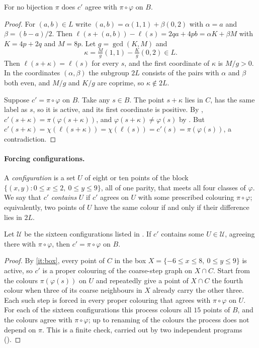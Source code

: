 \documentclass[11pt,colorlinks]{charlie}
\begin{document}
\begin{lemma}\label{lem:noblock}
For no bijection $\pi$ does $c'$ agree with $\pi\circ\varphi$ on $B$.
\end{lemma}

\begin{proof}
For $(a,b)\in L$ write $(a,b)=\alpha(1,1)+\beta(0,2)$ with $\alpha=a$ and $\beta=(b-a)/2$. Then $\ell(s+(a,b))-\ell(s)=2qa+4pb=\alpha K+\beta M$ with $K=4p+2q$ and $M=8p$. Let $g=\gcd(K,M)$ and
\[
\kappa=\tfrac Mg(1,1)-\tfrac Kg(0,2)\in L .
\]
Then $\ell(s+\kappa)=\ell(s)$ for every $s$, and the first coordinate of $\kappa$ is $M/g>0$. In the coordinates $(\alpha,\beta)$ the subgroup $2L$ consists of the pairs with $\alpha$ and $\beta$ both even, and $M/g$ and $K/g$ are coprime, so $\kappa\notin2L$.

Suppose $c'=\pi\circ\varphi$ on $B$. Take any $s\in B$. The point $s+\kappa$ lies in $C$, has the same label as $s$, so it is active, and its first coordinate is positive. By , $c'(s+\kappa)=\pi(\varphi(s+\kappa))$, and $\varphi(s+\kappa)\ne\varphi(s)$ by . But $c'(s+\kappa)=\chi(\ell(s+\kappa))=\chi(\ell(s))=c'(s)=\pi(\varphi(s))$, a contradiction.
\end{proof}

\paragraph{Forcing configurations.}
A \emph{configuration} is a set $U$ of eight or ten points of the block $\{(x,y):0\le x\le2,\ 0\le y\le9\}$, all of one parity, that meets all four classes of $\varphi$. We say that $c'$ \emph{contains} $U$ if $c'$ agrees on $U$ with some prescribed colouring $\pi\circ\varphi$; equivalently, two points of $U$ have the same colour if and only if their difference lies in $2L$.

\begin{lemma}\label{lem:patterns}
Let $\mathcal U$ be the sixteen configurations listed in . If $c'$ contains some $U\in\mathcal U$, agreeing there with $\pi\circ\varphi$, then $c'=\pi\circ\varphi$ on $B$.
\end{lemma}

\begin{proof}
By \ref{it:box}, every point of $C$ in the box $X=\{-6\le x\le8,\ 0\le y\le9\}$ is active, so $c'$ is a proper colouring of the coarse-step graph on $X\cap C$. Start from the colours $\pi(\varphi(s))$ on $U$ and repeatedly give a point of $X\cap C$ the fourth colour when three of its coarse neighbours in $X$ already carry the other three. Each such step is forced in every proper colouring that agrees with $\pi\circ\varphi$ on $U$. For each of the sixteen configurations this process colours all $15$ points of $B$, and the colours agree with $\pi\circ\varphi$; up to renaming of the colours the process does not depend on $\pi$. This is a finite check, carried out by two independent programs ().
\end{proof}
\end{document}

